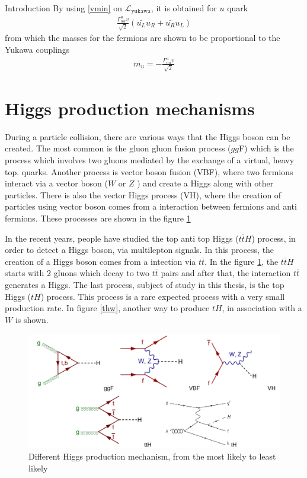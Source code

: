 \begin{chapter}{Introduction}
By using \ref{vmin} on $\mathcal{L}_\text{yukawa}$, it is obtained for $u$ quark
\begin{align*}
\frac{\Gamma^u_{uu}v}{\sqrt{2}}(\bar{u_L}u_R+\bar{u_R}u_L)
\end{align*}
from which the masses for the fermions are shown to be proportional to the Yukawa couplings
\begin{align*}
m_u=-\frac{\Gamma^u_{uu}v}{\sqrt{2}}
\end{align*}
 
\pagebreak

\section{Higgs production mechanisms}
During a particle collision, there are various ways that the Higgs boson can be created. The most common is the gluon gluon fusion process ($gg$F) which is the process which involves two gluons mediated by the exchange of a virtual, heavy top.
quarks. Another process is vector boson fusion (VBF), where two fermions interact via a vector boson ($W$ or $Z$ ) and create a Higgs along with other particles. There is also the vector Higgs process (VH), where the creation of particles using vector boson comes from a interaction between fermions and anti fermions\cite{pd}. These processes are shown in the figure \ref{psu}

In the recent years, people have studied the top anti top Higgs ($t\bar{t}H$) process, in order to detect a Higgs boson, via multilepton signals\cite{th1}.
In this process, the creation of a Higgs boson comes from a intection via $t\bar{t}$. In the figure \ref{psu}, the $t\bar{t}H$ starts with 2 gluons which decay to two $t\bar{t}$ pairs and after that, the interaction $t\bar{t}$ generates a Higgs. The last process, subject of study in this thesis, is the top Higgs ($tH$) process. This process is a rare expected process with a very small production rate\cite{pd}. In figure \ref{thw}, another way to produce $tH$, in association with a $W$ is shown.

\begin{figure}[ht]
\centering
\includegraphics[scale=0.5]{Chapter1/pg.png}
\caption[Higgs production mechanism]{Different Higgs production mechanism, from the most likely to least likely \cite{gamma}\cite{timo}}
\label{psu}
\end{figure}


\end{chapter}

